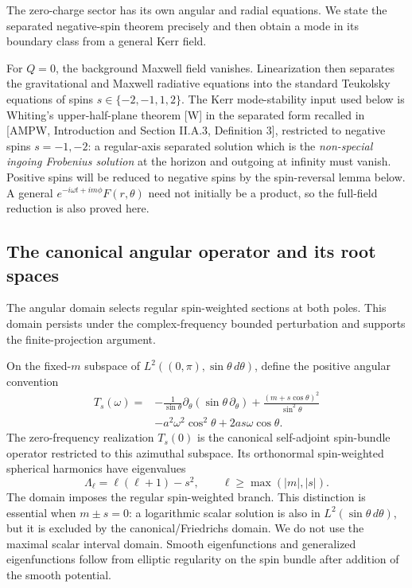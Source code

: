 \documentclass[11pt,a4paper]{article}
\begin{document}
The zero-charge sector has its own angular and radial equations. We state the separated negative-spin theorem precisely and then obtain a mode in its boundary class from a general Kerr field.

For \(Q=0\), the background Maxwell field vanishes. Linearization then
separates the gravitational and Maxwell radiative equations into the
standard Teukolsky equations of spins \(s\in\{-2,-1,1,2\}\). The Kerr
mode-stability input used below is Whiting's upper-half-plane theorem
{[}W{]} in the separated form recalled in {[}AMPW, Introduction and
Section II.A.3, Definition 3{]}, restricted to negative spins
\(s=-1,-2\): a regular-axis separated solution which is the
\emph{non-special ingoing Frobenius solution} at the horizon and
outgoing at infinity must vanish. Positive spins will be reduced to
negative spins by the spin-reversal lemma below. A general
\(e^{-i\omega t+im\phi}F(r,\theta)\) need not initially be a product, so
the full-field reduction is also proved here.

\subsection{The canonical angular operator and its root spaces}\label{readable-kerr-domain}

The angular domain selects regular spin-weighted sections at both poles. This domain persists under the complex-frequency bounded perturbation and supports the finite-projection argument.

On the fixed-\(m\) subspace of \(L^2((0,\pi),\sin\theta\,d\theta)\),
define the positive angular convention \[
 \begin{aligned}T_s(\omega)={}&
 -\frac1{\sin\theta}\partial_\theta(\sin\theta\,\partial_\theta)
 +\frac{(m+s\cos\theta)^2}{\sin^2\theta}\\
 & -a^2\omega^2\cos^2\theta+2as\omega\cos\theta .\end{aligned}
 \tag{50}
\] The zero-frequency realization \(T_s(0)\) is the canonical
self-adjoint spin-bundle operator restricted to this azimuthal subspace.
Its orthonormal spin-weighted spherical harmonics have eigenvalues \[
 \Lambda_\ell=\ell(\ell+1)-s^2,\qquad
 \ell\ge\max(|m|,|s|).
 \tag{51}
\] The domain imposes the regular spin-weighted branch. This distinction
is essential when \(m\pm s=0\): a logarithmic scalar solution is also in
\(L^2(\sin\theta\,d\theta)\), but it is excluded by the
canonical/Friedrichs domain. We do not use the maximal scalar interval
domain. Smooth eigenfunctions and generalized eigenfunctions follow from
elliptic regularity on the spin bundle after addition of the smooth
potential.
\end{document}
